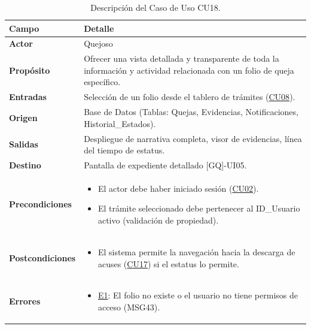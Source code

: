 \begin{appendices}
\begin{table}[htbp]
\centering
\small
{}
\begin{tabular}{|p{3.5cm}|p{10.5cm}|}
\hline
\rowcolor[HTML]{EFEFEF} 
\textbf{Campo} & \textbf{Detalle} \\ \hline
\textbf{Actor} & Quejoso \\ \hline
\textbf{Propósito} & Ofrecer una vista detallada y transparente de toda la información y actividad relacionada con un folio de queja específico. \\ \hline
\textbf{Entradas} & Selección de un folio desde el tablero de trámites (\hyperlink{anexo:casos_uso}{CU08}). \\ \hline
\textbf{Origen} & Base de Datos (Tablas: Quejas, Evidencias, Notificaciones, Historial\_Estados). \\ \hline
\textbf{Salidas} & Despliegue de narrativa completa, visor de evidencias, línea del tiempo de estatus. \\ \hline
\textbf{Destino} & Pantalla de expediente detallado [GQ]-UI05. \\ \hline
\textbf{Precondiciones} & 
\begin{itemize}[nosep, leftmargin=*]
    \item El actor debe haber iniciado sesión (\hyperlink{anexo:casos_uso}{CU02}).
    \item El trámite seleccionado debe pertenecer al ID\_Usuario activo (validación de propiedad).
\end{itemize} \\ \hline
\textbf{Postcondiciones} & 
\begin{itemize}[nosep, leftmargin=*]
    \item El sistema permite la navegación hacia la descarga de acuses (\hyperlink{anexo:casos_uso}{CU17}) si el estatus lo permite.
\end{itemize} \\ \hline
\textbf{Errores} & 
\begin{itemize}[nosep, leftmargin=*]
    \item \hyperlink{err:E23}{E1}: El folio no existe o el usuario no tiene permisos de acceso (MSG43).
\end{itemize} \\ \hline
\end{tabular}
\caption{Descripción del Caso de Uso CU18.}
\label{tab:cu18_especificacion}
\end{table}


\end{appendices}
